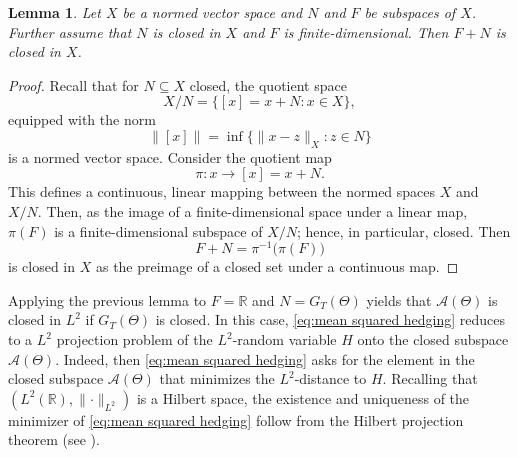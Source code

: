 \documentclass[11pt,a4paper,twoside,openany]{report}
\numberwithin{equation}{section}
\theoremstyle{plain} %
\newtheorem{lemma}[theorem]{Lemma}
\theoremstyle{definition} %
\theoremstyle{remark} %
\let\parencite\authnumparencite
\begin{document}
\begin{lemma}\label{lemma:A closed if G closed}
    Let \(X\) be a normed vector space and \(N\) and \(F\) be subspaces of \(X\). Further assume that \(N\) is closed in \(X\) and \(F\) is finite-dimensional. Then \(F+N\) is closed in \(X\).
\end{lemma}
\begin{proof}
    Recall that for \(N\subseteq X\) closed, the quotient space 
    \begin{equation*}
        X/N=\{[x]=x+N:x\in X\},
    \end{equation*}
   equipped with the norm
    \begin{equation*}
        \lVert [x]\rVert = \inf \{\lVert x-z\rVert_X:z\in N\}
    \end{equation*}
    is a normed vector space. Consider the quotient map
    \begin{equation*}
        \pi:x\to[x]=x+N.
    \end{equation*}
 This defines a continuous, linear mapping between the normed spaces \(X\) and \(X/N\).
    Then, as the image of a finite-dimensional space under a linear map, \(\pi(F)\) is a finite-dimensional subspace of \(X/N\); hence, in particular, closed. Then 
    \begin{equation*}
        F+N=\pi^{-1}\big(\pi(F)\big)
    \end{equation*}
    is closed in \(X\) as the preimage of a closed set under a continuous map.  
\end{proof}
Applying the previous lemma to \(F=\mathbb{R}\) and \(N=G_T(\Theta)\) yields that \(\mathcal{A}(\Theta)\) is closed in \(L^2\) if \(G_T(\Theta)\) is closed. In this case, \eqref{eq:mean squared hedging} reduces to a \(L^2\) projection problem of the \(L^2\)-random variable \(H\) onto the closed subspace \(\mathcal{A}(\Theta)\). 
Indeed, then \eqref{eq:mean squared hedging} asks for the element in the closed subspace \(\mathcal{A}(\Theta)\) that minimizes the \(L^2\)-distance to \(H\). Recalling that \((L^2(\mathbb{R}),\lVert\cdot\rVert_{L^2})\) is a Hilbert space, the existence and uniqueness of the minimizer of \eqref{eq:mean squared hedging} follow from the Hilbert projection theorem (see \parencite[Thm.~12.3]{Rudin1991FunctionalAnalysis}). 
\end{document}
